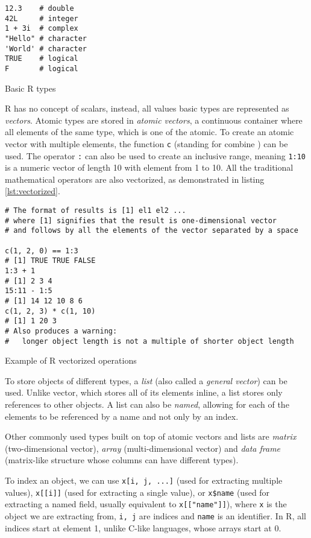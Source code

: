 \begin{listing}[h!]
	\centering
	\begin{verbatim}
12.3    # double
42L     # integer
1 + 3i  # complex
"Hello" # character
'World' # character
TRUE    # logical
F       # logical
    \end{verbatim}
	\caption{Basic R types}\label{lst:rtypes}
\end{listing}

R has no concept of scalars, instead, all values basic types are represented as \textit{vectors}. Atomic types are stored in \textit{atomic vectors}, a continuous container where all elements of the same type, which is one of the atomic. To create an atomic vector with multiple elements, the function \texttt{c} (standing for combine ) can be used. The operator \texttt{:} can also be used to create an inclusive range, meaning \texttt{1:10} is a numeric vector of length 10 with element from 1 to 10. All the traditional mathematical operators are also vectorized, as demonstrated in listing \ref{lst:vectorized}.

\begin{listing}[h!]
	\centering
	\begin{verbatim}
# The format of results is [1] el1 el2 ...
# where [1] signifies that the result is one-dimensional vector
# and follows by all the elements of the vector separated by a space

c(1, 2, 0) == 1:3
# [1] TRUE TRUE FALSE
1:3 + 1
# [1] 2 3 4
15:11 - 1:5
# [1] 14 12 10 8 6
c(1, 2, 3) * c(1, 10)
# [1] 1 20 3
# Also produces a warning:
#   longer object length is not a multiple of shorter object length
    \end{verbatim}
	\caption{Example of R vectorized operations}\label{lst:vectorized}
\end{listing}

To store objects of different types, a \textit{list} (also called a \textit{general vector}) can be used. Unlike vector, which stores all of its elements inline, a list stores only references to other objects. A list can also be \textit{named}, allowing for each of the elements to be referenced by a name and not only by an index.

Other commonly used types built on top of atomic vectors and lists are \textit{matrix} (two-dimensional vector), \textit{array} (multi-dimensional vector) and \textit{data frame} (matrix-like structure whose columns can have different types).

To index an object, we can use \texttt{x[i, j, ...]} (used for extracting multiple values), \texttt{x[[i]]} (used for extracting a single value), or \texttt{x\$name} (used for extracting a named field, usually equivalent to \texttt{x[["name"]]}), where \texttt{x} is the object we are extracting from, \texttt{i, j} are indices and \texttt{name} is an identifier. In R, all indices start at element 1, unlike C-like languages, whose arrays start at 0.

